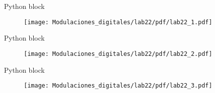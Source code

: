 \begin{frame}{Python block}
\vspace{-3mm}
\begin{figure}[H]
\centering
\texttt{[image: Modulaciones\_digitales/lab22/pdf/lab22\_1.pdf]}
\end{figure}
\end{frame}

\begin{frame}{Python block}
\vspace{-1cm}
\begin{figure}[H]
\centering
\texttt{[image: Modulaciones\_digitales/lab22/pdf/lab22\_2.pdf]}
\end{figure}
\end{frame}

\begin{frame}{Python block}
\vspace{-1cm}
\begin{figure}[H]
\centering
\texttt{[image: Modulaciones\_digitales/lab22/pdf/lab22\_3.pdf]}
\end{figure}
\end{frame}
